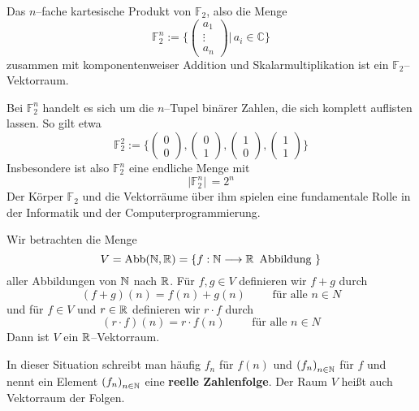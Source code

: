 \begin{beispiel} Das $n$--fache kartesische Produkt von $\mathbb F_2$, also die Menge
  	$$ \mathbb F_2^n := \{ \left( \begin{smallmatrix} a_1 \\ \vdots \\ a_n 
     	\end{smallmatrix} \right) \vert \, a_i \in \mathbb C \} $$
zusammen mit komponentenweiser Addition und Skalarmultiplikation ist ein 
$\mathbb F_2$--Vektorraum. 

Bei $\mathbb F_2^n$ handelt es sich um die $n$--Tupel binärer Zahlen, die sich 
komplett auflisten lassen. So gilt etwa 
  	$$ \mathbb F_2^2 := \{ \left( \begin{smallmatrix} 0 \\ 0 \end{smallmatrix} \right),
   	\left( \begin{smallmatrix} 0 \\ 1 \end{smallmatrix} \right), 
   	\left( \begin{smallmatrix} 1 \\ 0 \end{smallmatrix} \right),
   	\left( \begin{smallmatrix} 1 \\ 1 \end{smallmatrix} \right) \} $$
Insbesondere ist also $\mathbb F_2^n$ eine endliche Menge mit 
  	$$ \vert \mathbb F_2^n \vert \, = 2^n $$
Der Körper $\mathbb F_2$ und die Vektorräume über ihm spielen eine fundamentale 
Rolle in der Informatik und der Computerprogrammierung.
\end{beispiel}

\begin{beispiel}\label{LA_vr_folgen1}
Wir betrachten die Menge 
	$$ V = \mathrm{Abb}(\mathbb N, \mathbb R) = \{ f: \mathbb N \longrightarrow \mathbb R \, \text{ Abbildung }\} $$
aller Abbildungen von $\mathbb N$ nach $\mathbb R$. Für $f, g \in V$ definieren wir $f+g$ durch 
	$$ (f+g)(n) = f(n) + g(n) \qquad \text{ für alle } n \in N $$
und für $f \in V$ und $r \in \mathbb R$ definieren wir $r \cdot f$ durch
	$$ (r \cdot f)(n) = r \cdot f(n) \qquad \text{ für alle } n \in N $$
Dann ist $V$ ein $\mathbb R$--Vektorraum. 

In dieser Situation schreibt man häufig $f_n$ für $f(n)$ und $\left(f_n\right)_{n \in \mathbb N}$ für $f$ und nennt 
ein Element $\left(f_n\right)_{n \in \mathbb N}$ eine \textbf{reelle Zahlenfolge}. Der Raum $V$ heißt auch 
Vektorraum der Folgen.
\end{beispiel}

